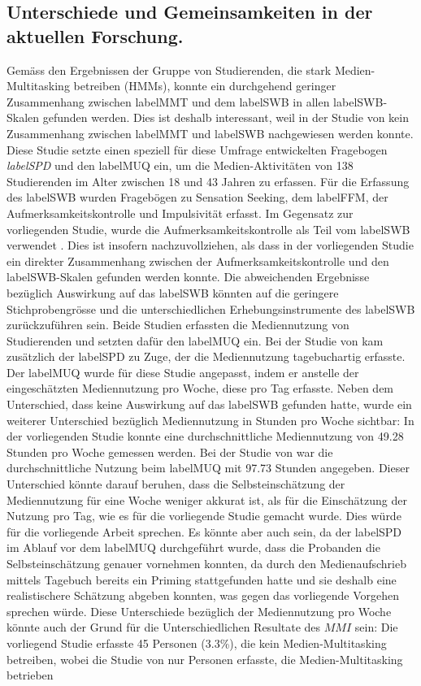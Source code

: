\subsection{Unterschiede und Gemeinsamkeiten in der aktuellen Forschung.} Gemäss den Ergebnissen der Gruppe von Studierenden, die stark Medien-Multitasking betreiben (HMMs), konnte ein durchgehend geringer Zusammenhang zwischen \gls{labelMMT} und dem \gls{labelSWB} in allen \gls{labelSWB}-Skalen gefunden werden. Dies ist deshalb interessant, weil in der Studie von  kein Zusammenhang zwischen \gls{labelMMT} und \gls{labelSWB} nachgewiesen werden konnte. Diese Studie setzte einen speziell für diese Umfrage entwickelten Fragebogen \textit{\gls{labelSPD}} und den \gls{labelMUQ} ein, um die Medien-Aktivitäten von 138 Studierenden im Alter zwischen 18 und 43 Jahren zu erfassen. Für die Erfassung des \gls{labelSWB} wurden Fragebögen zu Sensation Seeking, dem \gls{labelFFM}, der Aufmerksamkeitskontrolle und Impulsivität erfasst. Im Gegensatz zur vorliegenden Studie, wurde die Aufmerksamkeitskontrolle als Teil vom \gls{labelSWB} verwendet \cite{Fergus2012}. Dies ist insofern nachzuvollziehen, als dass in der vorliegenden Studie ein direkter Zusammenhang zwischen der Aufmerksamkeitskontrolle und den \gls{labelSWB}-Skalen gefunden werden konnte. Die abweichenden Ergebnisse bezüglich Auswirkung auf das \gls{labelSWB} könnten auf die geringere Stichprobengrösse und die unterschiedlichen Erhebungsinstrumente des \gls{labelSWB} zurückzuführen sein. Beide Studien erfassten die Mediennutzung von Studierenden und setzten dafür den \gls{labelMUQ} ein. Bei der Studie von \citeauthor{Shih2013} kam zusätzlich der \gls{labelSPD} zu Zuge, der die Mediennutzung tagebuchartig erfasste. Der \gls{labelMUQ} wurde für diese Studie angepasst, indem er anstelle der eingeschätzten Mediennutzung pro Woche, diese pro Tag erfasste. Neben dem Unterschied, dass  keine Auswirkung auf das \gls{labelSWB} gefunden hatte, wurde ein weiterer Unterschied bezüglich Mediennutzung in Stunden pro Woche sichtbar: In der vorliegenden Studie konnte eine durchschnittliche Mediennutzung von 49.28 Stunden pro Woche gemessen werden. Bei der Studie von \citeauthor{Shih2013} war die durchschnittliche Nutzung beim \gls{labelMUQ} mit 97.73 Stunden angegeben. Dieser Unterschied könnte darauf beruhen, dass die Selbsteinschätzung der Mediennutzung für eine Woche weniger akkurat ist, als für die Einschätzung der Nutzung pro Tag, wie es für die vorliegende Studie gemacht wurde. Dies würde für die vorliegende Arbeit sprechen. Es könnte aber auch sein, da der \gls{labelSPD} im Ablauf vor dem \gls{labelMUQ} durchgeführt wurde, dass die Probanden die Selbsteinschätzung genauer vornehmen konnten, da durch den Medienaufschrieb mittels Tagebuch bereits ein Priming stattgefunden hatte und sie deshalb eine realistischere Schätzung abgeben konnten, was gegen das vorliegende Vorgehen sprechen würde. Diese Unterschiede bezüglich der Mediennutzung pro Woche könnte auch der Grund für die Unterschiedlichen Resultate des $MMI$ sein: Die vorliegend Studie erfasste 45 Personen (3.3\%), die kein Medien-Multitasking betreiben, wobei die Studie von  nur Personen erfasste, die Medien-Multitasking betrieben 
